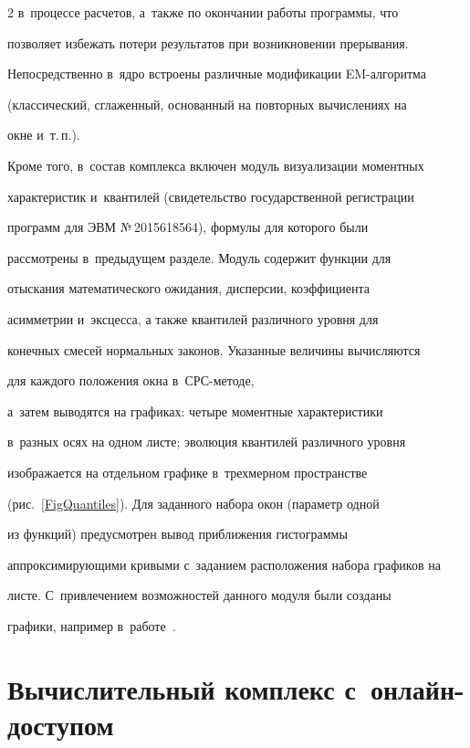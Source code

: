 \begin{multicols}{2}
в~процессе расчетов, а~так\-же по окончании работы программы, что

позволяет избежать потери результатов при возникновении прерывания.

Непосредственно в~ядро встроены различные модификации EM-ал\-го\-рит\-ма

(классический, сглаженный, основанный на повторных вычислениях на

окне и~т.\,п.).



Кроме того, в~состав комплекса включен модуль визуализации моментных

характеристик и~квантилей (свидетельство государственной регистрации

программ для ЭВМ №\,2015618564), формулы для которого были

рассмотрены в~предыдущем разделе. Модуль содержит функции для

отыскания математического ожидания, дисперсии, коэффициента

асимметрии и~эксцесса, а также квантилей различного уровня для

конечных смесей нормальных законов. Указанные величины вычисляются

для каждого положения окна в~СРС-ме\-то\-де, 

а~затем выводятся на графиках: четыре моментные характеристики 

в~разных осях на одном листе; эволюция квантилей различного уровня

изображается на отдельном графике в~трехмерном пространстве 

(рис.~\ref{FigQuantiles}). Для заданного набора окон (параметр одной

из функций) предусмотрен вывод приближения гистограммы

аппроксимирующими кривыми с~заданием расположения набора графиков на

лис\-те. С~привлечением возможностей данного модуля были созданы

графики, например в~работе~\cite{Gorshenin2015b}.



\vspace*{-6pt}



\section{Вычислительный комплекс с~онлайн-доступом}




\end{multicols}
